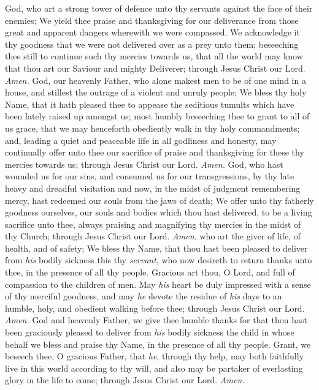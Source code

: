  God, who art a strong tower of defence unto thy servants against the face of their enemies; We yield thee praise and thanksgiving for our deliverance from those great and apparent dangers wherewith we were compassed. We acknowledge it thy goodness that we were not delivered over as a prey unto them; beseeching thee still to continue such thy mercies towards us, that all the world may know that thou art our Saviour and mighty Deliverer; through Jesus Christ our Lord. \textit{Amen.}
 God, our heavenly Father, who alone makest men to be of one mind in a house, and stillest the outrage of a violent and unruly people; We bless thy holy Name, that it hath pleased thee to appease the seditious tumults which have been lately raised up amongst us; most humbly beseeching thee to grant to all of us grace, that we may henceforth obediently walk in thy holy commandments; and, leading a quiet and peaceable life in all godliness and honesty, may continually offer unto thee our sacrifice of praise and thanksgiving for these thy mercies towards us; through Jesus Christ our Lord. \textit{Amen.}
 God, who hast wounded us for our sins, and consumed us for our transgressions, by thy late heavy and dreadful visitation and now, in the midst of judgment remembering mercy, hast redeemed our souls from the jaws of death; We offer unto thy fatherly goodness ourselves, our souls and bodies which thou hast delivered, to be a living sacrifice unto thee, always praising and magnifying thy mercies in the midst of thy Church; through Jesus Christ our Lord. \textit{Amen.}
 who art the giver of life, of health, and of safety; We bless thy Name, that thou hast been pleased to deliver from \textit{his} bodily sickness this thy \textit{servant}, who now desireth to return thanks unto thee, in the presence of all thy people. Gracious art thou, O Lord, and full of compassion to the children of men. May \textit{his} heart be duly impressed with a sense of thy merciful goodness, and may \textit{he} devote the residue of \textit{his} days to an humble, holy, and obedient walking before thee; through Jesus Christ our Lord. \textit{Amen.}
 God and heavenly Father, we give thee humble thanks for that thou hast been graciously pleased to deliver from \textit{his} bodily sickness the child in whose behalf we bless and praise thy Name, in the presence of all thy people. Grant, we beseech thee, O gracious Father, that \textit{he}, through thy help, may both faithfully live in this world according to thy will, and also may be partaker of everlasting glory in the life to come; through Jesus Christ our Lord. \textit{Amen.}
